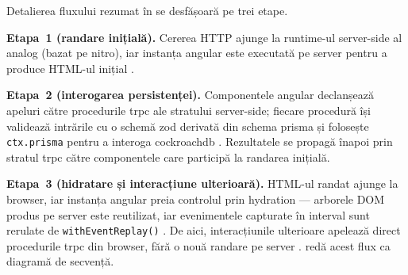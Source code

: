 Detalierea fluxului rezumat în  se desfășoară pe trei etape.

\textbf{Etapa~1 (randare inițială).} Cererea HTTP ajunge la runtime-ul server-side al \gls{analog} (bazat pe \gls{nitro}), iar instanța \gls{angular} este executată pe server pentru a produce HTML-ul inițial \cite{analog,nitro}.

\textbf{Etapa~2 (interogarea persistenței).} Componentele \gls{angular} declanșează apeluri către procedurile \gls{trpc} ale stratului server-side; fiecare procedură își validează intrările cu o schemă \gls{zod} derivată din schema \gls{prisma} și folosește \texttt{ctx.prisma} pentru a interoga \gls{cockroachdb} \cite{trpc,zod,prisma_zod_generator,prisma_cockroachdb}. Rezultatele se propagă înapoi prin stratul \gls{trpc} către componentele care participă la randarea inițială.

\textbf{Etapa~3 (hidratare și interacțiune ulterioară).} HTML-ul randat ajunge la browser, iar instanța \gls{angular} preia controlul prin \gls{hydration} --- arborele DOM produs pe server este reutilizat, iar evenimentele capturate în interval sunt rerulate de \texttt{withEventReplay()} \cite{analog}. De aici, interacțiunile ulterioare apelează direct procedurile \gls{trpc} din browser, fără o nouă \gls{randare} pe server \cite{trpc}.  redă acest flux ca diagramă de secvență.


